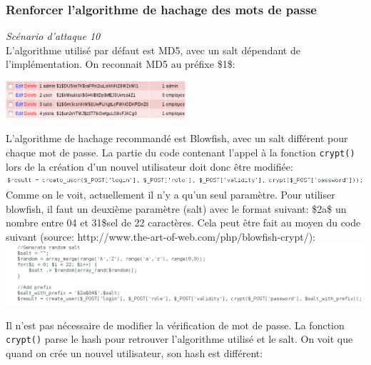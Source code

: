 \documentclass{article}
\begin{document}
\subsubsection{Renforcer l'algorithme de hachage des mots de passe}

\textit{Scénario d'attaque 10}\\

L'algorithme utilisé par défaut est MD5, avec un salt dépendant de
l'implémentation. On reconnait MD5 au préfixe \$1\$:

\begin{center}\includegraphics[width=0.5\textwidth]{images/crypt_avant.PNG}\end{center}

L'algorithme de hachage recommandé est Blowfish, avec un salt différent
pour chaque mot de passe. La partie du code contenant l'appel à la
fonction \texttt{crypt()} lors de la création d'un nouvel utilisateur
doit donc être modifiée:\\

\includegraphics[width=\textwidth]{images/crypt_avant2.PNG}\\

Comme on le voit, actuellement il n'y a qu'un seul paramètre. Pour
utiliser blowfish, il faut un deuxième paramètre (salt) avec le format
suivant: \$2a\$ un nombre entre 04 et 31\$sel de 22 caractères. Cela peut
être fait au moyen du code suivant (source: http://www.the-art-of-web.com/php/blowfish-crypt/):\\

\includegraphics[width=\textwidth]{images/crypt_apres.PNG}

Il n'est pas nécessaire de modifier la vérification de mot de passe. La
fonction \texttt{crypt()} parse le hash pour retrouver l'algorithme
utilisé et le salt. On voit que quand on crée un nouvel utilisateur, son
hash est différent:\\
\end{document}
